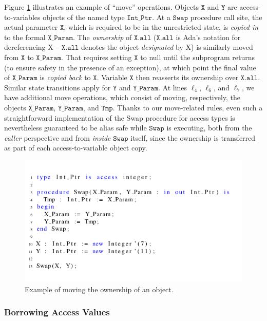 \documentclass{llncs}
\newcommand\var[1]{\ensuremath{\mathtt{#1}}}
\begin{document}
Figure \ref{fig:move_ex1} illustrates an example of ``move'' operations. Objects \var{X} and \var{Y} are access-to-variables objects of the named type \var{Int\_Ptr}. At a \var{Swap} procedure call site,
the actual parameter \var{X}, which is required to be in the unrestricted state, is \textit{copied in} to the formal \var{X\_Param}. The \textit{ownership} of \var{X.all} (\var{X.all} is Ada's notation for dereferencing X -- \var{X.all} denotes the object \textit{designated} by X) is similarly moved from \var{X} to \var{X\_Param}.
That requires setting \var{X} to null until the subprogram returns (to ensure safety in the presence of an exception), at which point the final value of \var{X\_Param} is \textit{copied back} to \var{X}.
Variable \var{X} then reasserts its ownership over \var{X.all}. Similar state transitions apply for \var{Y} and \var{Y\_Param}.  At lines $\ell_4$, $\ell_6$, and $\ell_7$,
we have additional move operations, which consist of moving, respectively, the objects \var{X\_Param}, \var{Y\_Param}, and \var{Tmp}. Thanks to our move-related rules, even such a straightforward
implementation of the Swap procedure for access types is nevertheless guaranteed to be alias safe while \var{Swap} is executing, both from the \textit{caller} perspective and from \textit{inside} \var{Swap} itself, since the ownership is transferred
as part of each access-to-variable object copy.

\begin{figure}[htb!]
\centering
   \includegraphics[]{move_ex1}
   \caption{Example of moving the ownership of an object.}
   \label{fig:move_ex1}
\end{figure}


\subsubsection{Borrowing Access Values}
\label{sec:borrowing}
\end{document}
